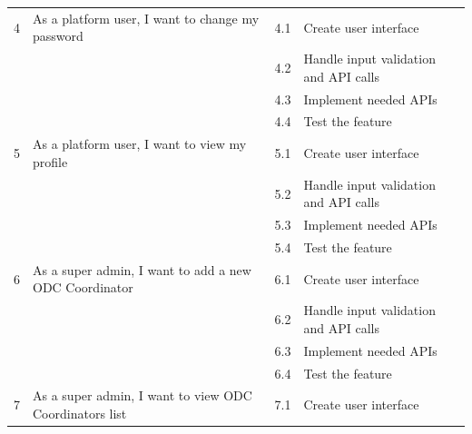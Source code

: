 \begin{longtable}{|p{1cm}|p{7cm}|p{1cm}|p{7cm}|}
    4                               & As a platform user, I want to change my password              & 4.1         & Create user interface                 \\ \cline{3-4}
                                    &                                                               & 4.2         & Handle input validation and API calls \\ \cline{3-4}
                                    &                                                               & 4.3         & Implement needed APIs                 \\ \cline{3-4}
                                    &                                                               & 4.4         & Test the feature                      \\ \hline
    5                               & As a platform user, I want to view my profile                 & 5.1         & Create user interface                 \\ \cline{3-4}
                                    &                                                               & 5.2         & Handle input validation and API calls \\ \cline{3-4}
                                    &                                                               & 5.3         & Implement needed APIs                 \\ \cline{3-4}
                                    &                                                               & 5.4         & Test the feature                      \\ \hline
    6                               & As a super admin, I want to add a new ODC Coordinator         & 6.1         & Create user interface                 \\ \cline{3-4}
                                    &                                                               & 6.2         & Handle input validation and API calls \\ \cline{3-4}
                                    &                                                               & 6.3         & Implement needed APIs                 \\ \cline{3-4}
                                    &                                                               & 6.4         & Test the feature                      \\ \hline
    7                               & As a super admin, I want to view ODC Coordinators list        & 7.1         & Create user interface                 \\ \cline{3-4}

\end{longtable}
